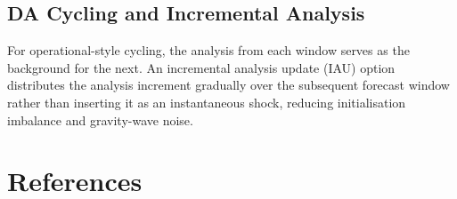\documentclass[11pt,a4paper]{article}
\begin{document}
\subsection{DA Cycling and Incremental Analysis}

For operational-style cycling, the analysis from each window serves as the background for the next.  An incremental analysis update (IAU) option distributes the analysis increment gradually over the subsequent forecast window rather than inserting it as an instantaneous shock, reducing initialisation imbalance and gravity-wave noise.

\section{References}
\end{document}
